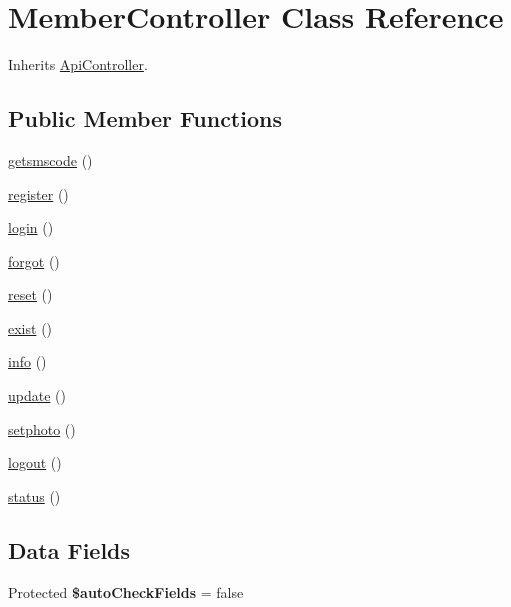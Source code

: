 \hypertarget{class_api_1_1_controller_1_1_member_controller}{}\section{Member\+Controller Class Reference}
\label{class_api_1_1_controller_1_1_member_controller}


Inherits \hyperlink{class_api_1_1_controller_1_1_api_controller}{Api\+Controller}.

\subsection*{Public Member Functions}
\begin{DoxyCompactItemize}
\item 
\hyperlink{class_api_1_1_controller_1_1_member_controller_ac7ab25a032af896296145ac01460e9c7}{getsmscode} ()
\item 
\hyperlink{class_api_1_1_controller_1_1_member_controller_acc294a6cc8e69743746820e3d15e3f78}{register} ()
\item 
\hyperlink{class_api_1_1_controller_1_1_member_controller_aa311da27ba5706f5710cea7706c8eae1}{login} ()
\item 
\hyperlink{class_api_1_1_controller_1_1_member_controller_a760860eafd7560576c2c12824a800a6d}{forgot} ()
\item 
\hyperlink{class_api_1_1_controller_1_1_member_controller_a4a20559544fdf4dcb457e258dc976cf8}{reset} ()
\item 
\hyperlink{class_api_1_1_controller_1_1_member_controller_a3df9f5eae7430bdbfaebfcd9bca5f00b}{exist} ()
\item 
\hyperlink{class_api_1_1_controller_1_1_member_controller_a8ece94e57064ea71801015df652bed08}{info} ()
\item 
\hyperlink{class_api_1_1_controller_1_1_member_controller_a842e4774e3b3601a005b995c02f7e883}{update} ()
\item 
\hyperlink{class_api_1_1_controller_1_1_member_controller_a46ebc020150dfdfba0b5a3b4ce1829af}{setphoto} ()
\item 
\hyperlink{class_api_1_1_controller_1_1_member_controller_a082405d89acd6835c3a7c7a08a7adbab}{logout} ()
\item 
\hyperlink{class_api_1_1_controller_1_1_member_controller_a19e49aea71e41a8bd6076bc45169e4a3}{status} ()
\end{DoxyCompactItemize}
\subsection*{Data Fields}
\begin{DoxyCompactItemize}
\item 
\hypertarget{class_api_1_1_controller_1_1_member_controller_a79f6e7f10d34dfbf080ae84d0f8b560b}{}Protected {\bfseries \$auto\+Check\+Fields} = false\label{class_api_1_1_controller_1_1_member_controller_a79f6e7f10d34dfbf080ae84d0f8b560b}

\end{DoxyCompactItemize}
